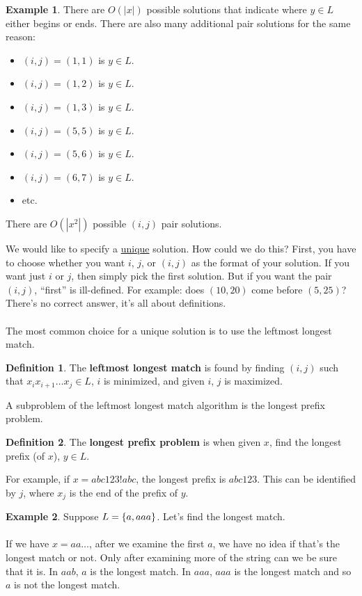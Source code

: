 \documentclass[]{article}
\DeclarePairedDelimiter{\set}{\lbrace}{\rbrace}
\theoremstyle{definition}
\newtheorem*{defn}{Definition}
\newtheorem{ex}{Example}[section]
\begin{document}
\begin{ex}
				There are $O(|x|)$ possible solutions that indicate where $y \in L$ either begins or ends. There are also many additional pair solutions for the same reason:
				\begin{itemize}
					\item $(i, j) = (1, 1)$ is $y \in L$.
					\item $(i, j) = (1, 2)$ is $y \in L$.
					\item $(i, j) = (1, 3)$ is $y \in L$.
					\item $(i, j) = (5, 5)$ is $y \in L$.
					\item $(i, j) = (5, 6)$ is $y \in L$.
					\item $(i, j) = (6, 7)$ is $y \in L$.
					\item etc.
				\end{itemize}

				There are $O(|x^2|)$ possible $(i, j)$ pair solutions.
			\end{ex}
			We would like to specify a \underline{unique} solution. How could we do this? First, you have to choose whether you want $i$, $j$, or $(i, j)$ as the format of your solution. If you want just $i$ or $j$, then simply pick the first solution. But if you want the pair $(i, j)$, ``first'' is ill-defined. For example: does $(10, 20)$ come before $(5, 25)$? There's no correct answer, it's all about definitions.
			\\ \\
			The most common choice for a unique solution is to use the leftmost longest match.
			\begin{defn}
				The \textbf{leftmost longest match} is found by finding $(i, j)$ such that $x_i x_{i + 1} \ldots x_j \in L$, $i$ is minimized, and given $i$, $j$ is maximized.
			\end{defn}
			A subproblem of the leftmost longest match algorithm is the longest prefix problem.
			\begin{defn}
				The \textbf{longest prefix problem} is when given $x$, find the longest prefix (of $x$), $y \in L$.
			\end{defn}

			For example, if $x = abc123!abc$, the longest prefix is $abc123$. This can be identified by $j$, where $x_j$ is the end of the prefix of $y$.
			\begin{ex}
				Suppose $L = \set{a, aaa}$. Let's find the longest match.
				\\ \\
				If we have $x = aa\ldots$, after we examine the first $a$, we have no idea if that's the longest match or not. Only after examining more of the string can we be sure that it is. In $aab$, $a$ is the longest match. In $aaa$, $aaa$ is the longest match and so $a$ is not the longest match.
			\end{ex}
\end{document}
